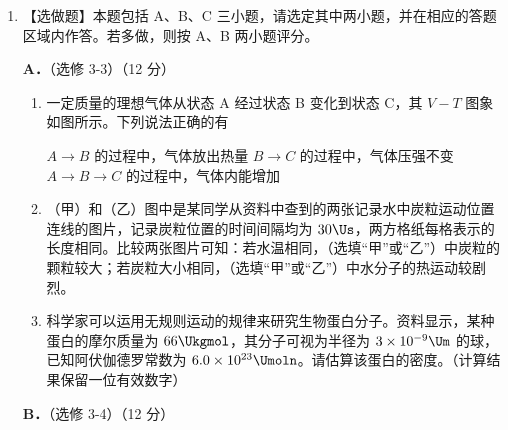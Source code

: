 \documentclass[\gkver]{gaokaozhenti}
\begin{document}
\begin{enumerate}
{（2）要用多用电表的直流电压挡探测故障，应将选择开关旋至面板直流电压挡 C 上。

（3）如果只有 b、c 间断路，说明 b 点与电源的负极间不通，a、b 间的电压为零，表笔接在 a、b 间时，指针不偏转；c 点与电源的负极相通，a 与电源的正极相通，a、c 间有电压，因此两表笔接入 a、c 间时指针发生偏转。

（4）排除故障后，欲使衔铁在热敏电阻为 $50\UdC$ 时被吸合，应先断开开关，用电阻箱替换热敏电阻，并将阻值调至 $108.1\UO$，合上开关，调节滑动变阻器的阻值，直至观察到继电器的衔铁被吸合，这时断开开关，将电阻箱从电路中移除，将热敏电阻再接入电路。因此操作步骤的正确顺序是⑤④②③①。
}

\item
【选做题】本题包括 A、B、C 三小题，请选定其中两小题，并在相应的答题区域内作答。若多做，则按 A、B 两小题评分。

\textbf{A．}（选修 3-3）（12 分）

\begin{enumerate}
	\item
	一定质量的理想气体从状态 A 经过状态 B 变化到状态 C，其 $V-T$ 图象如图所示。下列说法正确的有

	\onepicture[align=right, w=3.10cm]{}

	{$A\to B$ 的过程中，气体放出热量}
	{$B\to C$ 的过程中，气体压强不变}
	{$A\to B\to C$ 的过程中，气体内能增加}
	\item
	（甲）和（乙）图中是某同学从资料中查到的两张记录水中炭粒运动位置连线的图片，记录炭粒位置的时间间隔均为 $30\Us$，两方格纸每格表示的长度相同。比较两张图片可知：若水温相同，（选填“甲”或“乙”）中炭粒的颗粒较大；若炭粒大小相同，（选填“甲”或“乙”）中水分子的热运动较剧烈。

	\item
	科学家可以运用无规则运动的规律来研究生物蛋白分子。资料显示，某种蛋白的摩尔质量为 $66\Ukgmol$，其分子可视为半径为 $3\times10^{-9}\Um$ 的球，已知阿伏伽德罗常数为 $6.0\times10^{23}\Umoln$。请估算该蛋白的密度。（计算结果保留一位有效数字）
\end{enumerate}

\textbf{B．}（选修 3-4）（12 分）


\end{enumerate}
\end{document}
